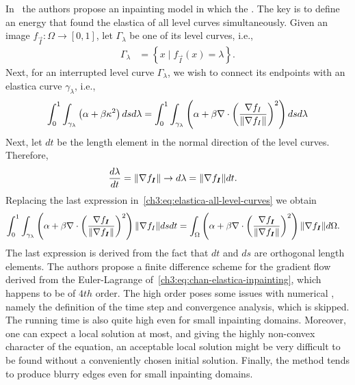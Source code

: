 In~\cite{chan02elasticainpainting} the authors propose an inpainting model in which the . The key is to define an energy that found the elastica of all level curves simultaneously. Given an image $f_{\vec{I}}:\Omega \rightarrow [0,1]$, let $\Gamma_{\lambda}$ be one of its level curves, i.e.,
\begin{align*}
	\Gamma_{\lambda} &= \left\{ x \; | \; f_{\vec{I}}(x)=\lambda \right\}.
\end{align*}
%
Next, for an interrupted level curve $\Gamma_{\lambda}$, we wish to connect its endpoints with an elastica curve $\gamma_{\lambda}$, i.e.,
%
\begin{align}
	\int_{0}^{1}{ \int_{\gamma_{\lambda}}{ \left( \alpha + \beta \kappa ^2 \right) dsd\lambda}} = \int_{0}^{1}{ \int_{\gamma_{\lambda}}{ \left(\alpha + \beta \nabla \cdot \left(\frac{\nabla f_I}{\lVert\nabla f_I\rVert}\right) ^2 \right) dsd\lambda}}
	\label{ch3:eq:elastica-all-level-curves}
\end{align}
%
 Next, let $dt$ be the length element in the normal direction of the level curves. Therefore,
\begin{align*}
	\frac{d \lambda}{d t} &= \lVert\nabla f_{\bm{I}}\rVert \rightarrow d\lambda = \lVert\nabla f_{\bm{I}}\rVert dt.
\end{align*}
%
Replacing the last expression in~\cref{ch3:eq:elastica-all-level-curves} we obtain
\begin{align}
	\int_{0}^{1}{ \int_{\gamma_{\lambda}}{ \left(\alpha + \beta \nabla \cdot \left(\frac{\nabla f_{\bm{I}}}{\lVert\nabla f_{\bm{I}} \rVert}\right) ^2 \right)\lVert\nabla f_I\rVert dsdt}} &= \int_{\Omega}{ \left(\alpha + \beta \nabla \cdot \left(\frac{\nabla f_{\bm{I}}}{\lVert\nabla f_{\bm{I}} \rVert}\right) ^2 \right)\lVert\nabla f_{\bm{I}} \rVert d\Omega}.
	\label{ch3:eq:chan-elastica-inpainting}
\end{align}
%
The last expression is derived from the fact that $dt$ and $ds$ are orthogonal length elements.  The authors propose a finite difference scheme for the gradient flow derived from the Euler-Lagrange of~\cref{ch3:eq:chan-elastica-inpainting}, which happens to be of $4th$ order. The high order poses some issues with numerical , namely the definition of the time step and convergence analysis, which is skipped. The running time is also quite high even for small inpainting domains. Moreover, one can expect a local solution at most, and giving the highly non-convex character of the equation, an acceptable local solution might be very difficult to be found without a conveniently chosen initial solution. Finally, the  method tends to produce blurry edges even for small inpainting domains. 

